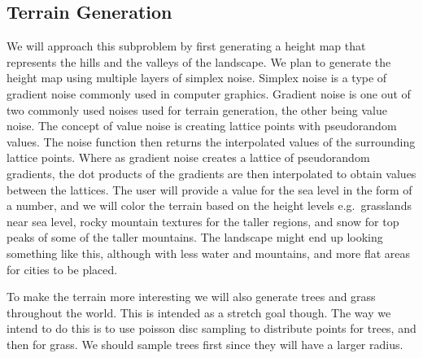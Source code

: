\subsection{Terrain Generation}
We will approach this subproblem by first generating a height map that represents the hills and the valleys of the landscape. 
We plan to generate the height map using multiple layers of simplex noise.
Simplex noise is a type of gradient noise commonly used in computer graphics. 
Gradient noise is one out of two commonly used noises used for terrain generation, the other being value noise.  
The concept of value noise is creating lattice points with pseudorandom values. 
The noise function then returns the interpolated values of the surrounding lattice points. 
Where as gradient noise creates a lattice of pseudorandom gradients, the dot products of the gradients are then interpolated to obtain values between the lattices. 
The user will provide a value for the sea level in the form of a number, and we will color the terrain based on the height levels e.g.\ grasslands near sea level, rocky mountain textures for the taller regions, and snow for top peaks of some of the taller mountains.
The landscape might end up looking something like this, although with less water and mountains, and more flat areas for cities to be placed.

To make the terrain more interesting we will also generate trees and grass throughout the world.
This is intended as a stretch goal though.
The way we intend to do this is to use poisson disc sampling to distribute points for trees, and then for grass. %
We should sample trees first since they will have a larger radius.


 
 